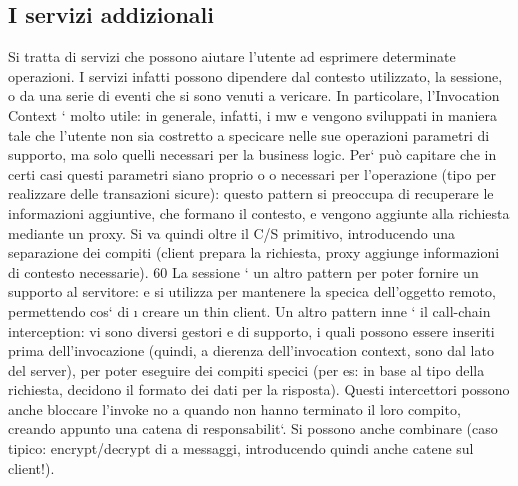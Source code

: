 \documentclass[a4paper,12pt]{article}
\begin{document}
\subsection{I servizi addizionali}
Si tratta di servizi che possono aiutare l'utente ad esprimere determinate operazioni. I servizi infatti possono
dipendere dal contesto utilizzato, la sessione, o
da una serie di eventi che si sono venuti a vericare.
In particolare, l'Invocation Context ` molto utile: in generale, infatti, i mw
e
vengono sviluppati in maniera tale che l'utente non sia costretto a specicare
nelle sue operazioni parametri di supporto, ma solo quelli necessari per la business logic. Per` può capitare che in
certi casi questi parametri siano proprio
o
o
necessari per l'operazione (tipo per realizzare delle transazioni sicure): questo
pattern si preoccupa di recuperare le informazioni aggiuntive, che formano il
contesto, e vengono aggiunte alla richiesta mediante un proxy. Si va quindi
oltre il C/S primitivo, introducendo una separazione dei compiti (client prepara
la richiesta, proxy aggiunge informazioni di contesto necessarie).
60
La sessione ` un altro pattern per poter fornire un supporto al servitore:
e
si utilizza per mantenere la specica dell'oggetto remoto, permettendo cos` di
\i{}
creare un thin client.
Un altro pattern inne ` il call-chain interception: vi sono diversi gestori
e
di supporto, i quali possono essere inseriti prima dell'invocazione (quindi, a
dierenza dell'invocation context, sono dal lato del server), per poter eseguire
dei compiti specici (per es: in base al tipo della richiesta, decidono il formato
dei dati per la risposta). Questi intercettori possono anche bloccare l'invoke no
a quando non hanno terminato il loro compito, creando appunto una catena di
responsabilit`. Si possono anche combinare (caso tipico: encrypt/decrypt di
a
messaggi, introducendo quindi anche catene sul client!).
\end{document}
